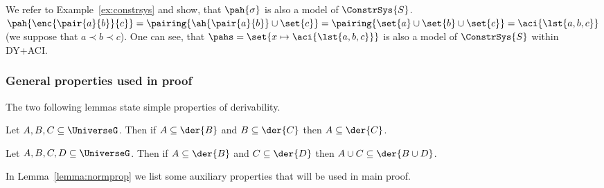 \begin{example}\label{ex:constrsysmodel}
 We refer to Example~\ref{ex:constrsys} and show, that $\pah{\sigma}$ is also a model of $\ConstrSys{S}$.
$\pah{\enc{\pair{a}{b}}{c}} = \pairing{\ah{\pair{a}{b}}\cup \set{c}} = \pairing{\set{a}\cup\set{b} \cup \set{c}} = \aci{\lst{a,b,c}}$ (we suppose that $a\prec b \prec c$).
One can see, that $\pahs=\set{x\mapsto \aci{\lst{a,b,c}}}$ is also a model of $\ConstrSys{S}$ within DY+ACI.
\end{example}



\subsubsection{General properties used in proof}

The two following lemmas state simple properties of derivability.

\begin{lemma}\label{lemma:dertrans}
 Let $A,B,C \subseteq \UniverseG$. Then if $A\subseteq \der{B}$ and $B\subseteq \der{C}$ then $A\subseteq \der{C}$.

\end{lemma}

\begin{lemma}\label{lemma:derext}
 Let $A,B,C,D \subseteq \UniverseG$. Then if $A\subseteq \der{B}$ and $C\subseteq \der{D}$ then $A\cup C \subseteq \der{B\cup D}$.

\end{lemma}

In Lemma~\ref{lemma:normprop} we list some auxiliary properties that will be used in main proof.




